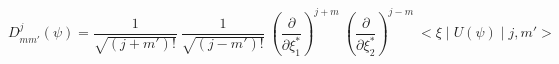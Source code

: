 \begin{equation}
D_{mm'}^j(\psi)= \frac{1}{\sqrt{(j+m')!}}~\frac{1}{\sqrt{(j-m')!}}~ (\frac{\partial}{\partial \xi_1^*})^{j+m}~(\frac{\partial}{\partial \xi_2^*})^{j-m}~ <\xi\mid U(\psi)\mid j,m'>
\end{equation}

